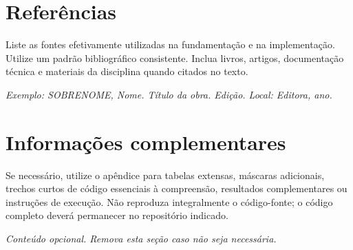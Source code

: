 \documentclass[11pt,a4paper]{article}
\newcommand{\placeholder}[1]{\textcolor{muted}{\textit{#1}}}
\begin{document}
\section{Referências}

\begin{orientacao}
Liste as fontes efetivamente utilizadas na fundamentação e na implementação. Utilize um padrão bibliográfico consistente. Inclua livros, artigos, documentação técnica e materiais da disciplina quando citados no texto.
\end{orientacao}

\placeholder{Exemplo: SOBRENOME, Nome. Título da obra. Edição. Local: Editora, ano.}

\appendix
\section{Informações complementares}

\begin{orientacao}
Se necessário, utilize o apêndice para tabelas extensas, máscaras adicionais, trechos curtos de código essenciais à compreensão, resultados complementares ou instruções de execução. Não reproduza integralmente o código-fonte; o código completo deverá permanecer no repositório indicado.
\end{orientacao}

\placeholder{Conteúdo opcional. Remova esta seção caso não seja necessária.}
\end{document}
